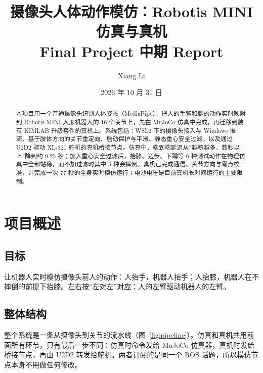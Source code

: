 \documentclass[11pt,a4paper]{article}
\title{\textbf{摄像头人体动作模仿：Robotis MINI 仿真与真机}\\[4pt]\large Final Project 中期 Report}
\author{Xiang Li}
\date{2026 年 10 月 31 日}
\begin{document}
\maketitle
\thispagestyle{empty}

\begin{abstract}
\noindent
本项目用一个普通摄像头识别人体姿态（MediaPipe），把人的手臂和腿的动作实时映射到 Robotis MINI 人形机器人的 16 个关节上，先在 MuJoCo 仿真中完成，再迁移到装有 KIMLAB 升级套件的真机上。系统包括：WSL2 下的摄像头接入与 Windows 推流、基于肢体方向的关节重定向、启动保护与平滑、静态重心安全过滤，以及通过 U2D2 驱动 XL-320 舵机的真机桥接节点。仿真中，端到端延迟从“越积越多、数秒以上”降到约 0.25 秒；加入重心安全过滤后，抬膝、迈步、下蹲等 6 种测试动作在物理仿真中全部站稳，而不加过滤时其中 5 种会摔倒。真机已完成通信、关节方向与零点校准，并完成一次 77 秒的全身实时模仿运行；电池电压是目前真机长时间运行的主要限制。
\end{abstract}

\tableofcontents
\newpage

\section{项目概述}

\subsection{目标}
让机器人实时模仿摄像头前人的动作：人抬手，机器人抬手；人抬膝，机器人在不摔倒的前提下抬膝。左右按“左对左”对应：人的左臂驱动机器人的左臂。

\subsection{整体结构}
整个系统是一条从摄像头到关节的流水线（图~\ref{fig:pipeline}）。仿真和真机共用前面所有环节，只有最后一步不同：仿真时命令发给 MuJoCo 仿真器，真机时发给桥接节点，再由 U2D2 转发给舵机。两者订阅的是同一个 ROS 话题，所以模仿节点本身不用做任何修改。
\end{document}
